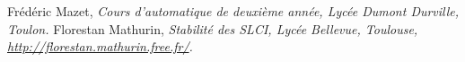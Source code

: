 \documentclass[10pt,fleqn]{article} %
\begin{document}
\begin{thebibliography}{2}
    Frédéric Mazet, {\it Cours d'automatique de deuxième année, Lycée Dumont Durville, Toulon.}
       Florestan Mathurin, {\it Stabilité des SLCI, Lycée Bellevue, Toulouse, \url{http://florestan.mathurin.free.fr/}.}



\end{thebibliography}
\end{document}
